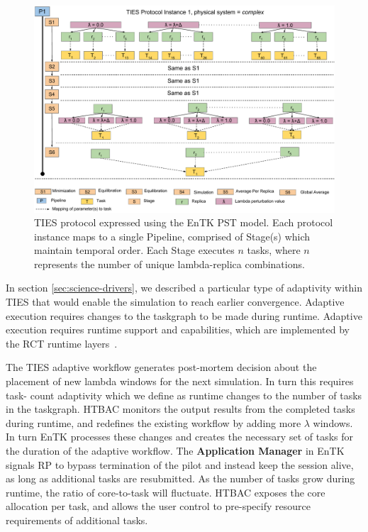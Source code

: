 \begin{figure}
  \centering
   \includegraphics[width=\columnwidth]{figures/_TIES_EnTK_implementation.pdf}
  \caption{TIES protocol expressed using the EnTK PST model. Each protocol 
  instance maps to a single Pipeline, comprised of Stage(s) which maintain 
  temporal order. Each Stage executes $n$ tasks, where $n$ represents the 
  number of unique lambda-replica combinations.}
\label{fig:pst}
\end{figure}

In section \ref{sec:science-drivers}, we described a particular type of
adaptivity within TIES that would enable the simulation to reach earlier
convergence. Adaptive execution requires changes to the taskgraph to be made
during runtime. Adaptive execution requires runtime support and capabilities,
which are implemented by the RCT runtime layers~\cite{power-of-many17}.

The TIES adaptive workflow generates post-mortem decision about the placement
of new lambda windows for the next simulation. In turn this requires task-
count adaptivity which we define as runtime changes to the number of tasks in
the taskgraph. HTBAC monitors the output results from the completed tasks
during runtime, and redefines the existing workflow by adding more $\lambda$
windows. In turn EnTK processes these changes and creates the necessary set of
tasks for the duration of the adaptive workflow. The \textbf{Application
Manager} in EnTK signals RP to bypass termination of the pilot and instead
keep the session alive, as long as additional tasks are resubmitted. As the
number of tasks grow during runtime, the ratio of core-to-task will fluctuate.
HTBAC exposes the core allocation per task, and allows the user control to
pre-specify resource requirements of additional tasks.

